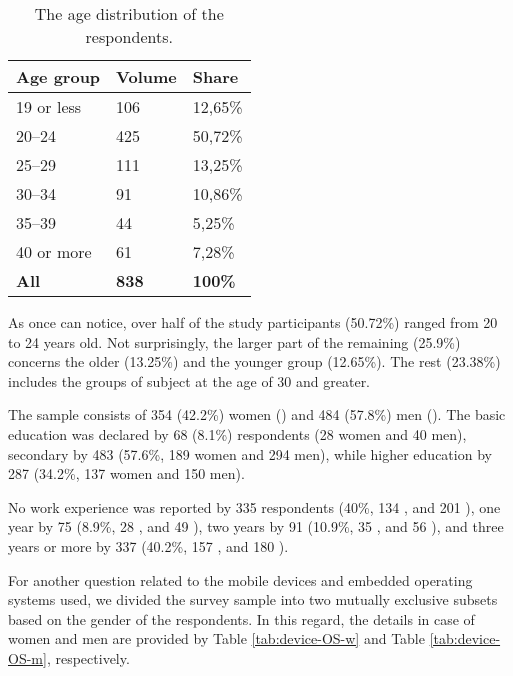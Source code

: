 \documentclass[preprint,12pt]{elsarticle}
\begin{document}
\begin{table}[h]
\centering
\small
\begin{tabular}{|l|l|l|}
\hline
\textbf{Age group} & \textbf{Volume}  & \textbf{Share}     \\ \hline
19 or less      & 106   & 12,65\% \\ \hline
20--24          & 425   & 50,72\% \\ \hline
25--29          & 111   & 13,25\% \\ \hline
30--34          & 91    & 10,86\% \\ \hline
35--39          & 44    & 5,25\% \\ \hline
40 or more      & 61    & 7,28\%  \\ \hline
\textbf{All}    & \textbf{838}   & \textbf{100\%} \\ \hline
\end{tabular}
\caption{\label{tab:sample-age}The age distribution of the respondents.}
\end{table}

As once can notice, over half of the study participants (50.72\%) ranged from 20 to 24 years old. Not surprisingly, the larger part of the remaining (25.9\%) concerns the older (13.25\%) and the younger group (12.65\%). The rest (23.38\%) includes the groups of subject at the age of 30 and greater.

The sample consists of 354 (42.2\%) women (\female)  and 484 (57.8\%) men (\male).
The basic education was declared by 68 (8.1\%) respondents (28 women and 40 men), secondary by 483 (57.6\%, 189 women and 294 men), while higher education by 287 (34.2\%, 137 women and 150 men). 

No work experience was reported by 335 respondents (40\%, 134 \female, and 201 \male), 
one year by 75 (8.9\%, 28 \female, and 49 \male), two years by 91 (10.9\%, 35 \female, and 56 \male), and three years or more by 337 (40.2\%, 157 \female, and 180 \male). 

For another question related to the mobile devices and embedded operating systems used, we divided the survey sample into two mutually exclusive subsets based on the gender of the respondents. In this regard, the details in case of women and men are provided by Table \ref{tab:device-OS-w} and Table \ref{tab:device-OS-m}, respectively.
\end{document}
